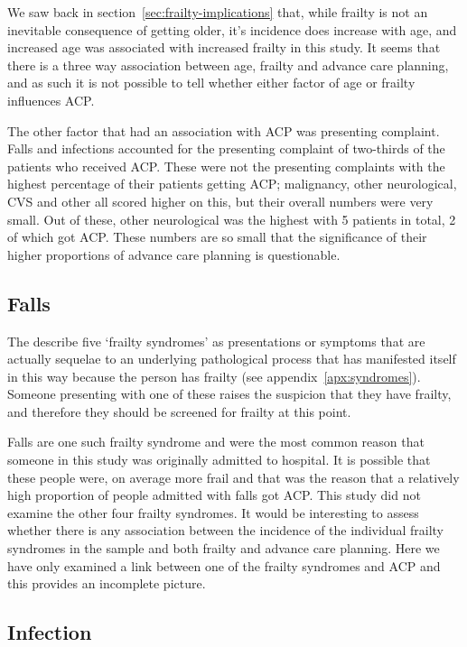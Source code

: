 \documentclass
[
	12pt,
	a4paper,
	oneside,
]{report}
\begin{document}
We saw back in 
section~\ref{sec:frailty-implications} that, while frailty is not an
inevitable consequence of getting older, it's incidence does increase with age,
and increased age was associated with increased frailty in this study. It seems
that there is a three way association between age, frailty and advance care 
planning, and as such it is not possible to tell whether either factor of 
age or frailty influences ACP. 

The other factor that had an association with ACP was presenting complaint.
Falls and infections accounted for the presenting complaint of two-thirds
of the patients who received ACP. These were not the presenting complaints
with the highest percentage of their patients getting ACP; malignancy, other
neurological, CVS and other all scored higher on this, but their overall numbers
were very small. Out of these, other neurological was the highest with 5 patients in 
total, 2 of which got ACP. These numbers are so small that the significance
of their higher proportions of advance care planning is questionable. 

\subsection{Falls}

The \textcite{bgs:14} describe five `frailty syndromes' as presentations or 
symptoms that are actually sequelae to an underlying pathological process
that has manifested itself in this way because the person has frailty
(see appendix~\ref{apx:syndromes}).
Someone presenting with one of these raises the suspicion that they have frailty,
and therefore they should be screened for frailty at this point.

Falls are one such frailty syndrome and were the most common reason that someone
in this study was originally admitted to hospital. It is possible that these
people were, on average more frail and that was the reason that a 
relatively high proportion of people admitted with falls got ACP.
This study did not examine the other four frailty syndromes. 
It would be interesting to assess whether there is 
any association between the incidence of the individual frailty syndromes 
in the sample and both frailty and advance care planning. Here we have only
examined a link between one of the frailty syndromes and ACP and this
provides an incomplete picture.  

\subsection{Infection}
\end{document}
